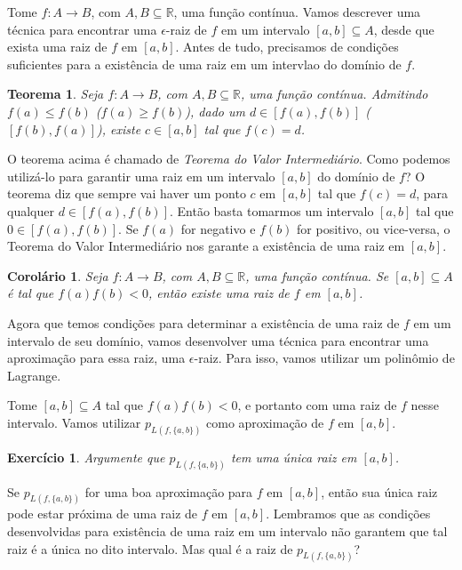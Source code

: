 \documentclass[]{article}
\newtheorem{teorema}{Teorema}
\newtheorem{corolario}{Corolário}
\newtheorem{exercicio}{Exercício}
\numberwithin{equation}{section}
\begin{document}
Tome $f : A \to B$, com $A, B \subseteq \mathbb{R}$, uma função
contínua. Vamos descrever uma técnica para encontrar uma
$\epsilon$-raiz de $f$ em um intervalo $[a, b] \subseteq A$, desde que
exista uma raiz de $f$ em $[a, b]$. Antes de tudo, precisamos de
condições suficientes para a existência de uma raiz em um intervlao do
domínio de $f$.

\begin{teorema}
  Seja $f : A \to B$, com $A, B \subseteq \mathbb{R}$, uma função
  contínua. Admitindo $f(a) \leq f(b)$ ($f(a) \geq f(b)$), dado um
  $d \in [f(a), f(b)]$ ($[f(b), f(a)]$), existe $c \in [a, b]$ tal que
  $f(c) = d$.
\end{teorema}

O teorema acima é chamado de \emph{Teorema do Valor
  Intermediário}. Como podemos utilizá-lo para garantir uma raiz em um
intervalo $[a, b]$ do domínio de $f$? O teorema diz que sempre vai
haver um ponto $c$ em $[a, b]$ tal que $f(c) = d$, para qualquer
$d \in [f(a), f(b)]$. Então basta tomarmos um intervalo $[a, b]$ tal
que $0 \in [f(a), f(b)]$. Se $f(a)$ for negativo e $f(b)$ for
positivo, ou vice-versa, o Teorema do Valor Intermediário nos garante
a existência de uma raiz em $[a, b]$.

\begin{corolario}
  Seja $f : A \to B$, com $A, B \subseteq \mathbb{R}$, uma função
  contínua. Se $[a, b] \subseteq A$ é tal que $f(a)f(b) < 0$, então
  existe uma raiz de $f$ em $[a, b]$.
\end{corolario}

Agora que temos condições para determinar a existência de uma raiz de
$f$ em um intervalo de seu domínio, vamos desenvolver uma técnica para
encontrar uma aproximação para essa raiz, uma $\epsilon$-raiz. Para
isso, vamos utilizar um polinômio de Lagrange.

Tome $[a, b] \subseteq A$ tal que $f(a)f(b) < 0$, e portanto com uma
raiz de $f$ nesse intervalo. Vamos utilizar $p_{L(f, \{a, b\})}$ como
aproximação de $f$ em $[a, b]$.

\begin{exercicio}
  Argumente que $p_{L(f, \{a, b\})}$ tem uma única raiz em $[a, b]$.
\end{exercicio}

Se $p_{L(f, \{a, b\})}$ for uma boa aproximação para $f$ em $[a, b]$,
então sua única raiz pode estar próxima de uma raiz de $f$ em
$[a, b]$. Lembramos que as condições desenvolvidas para existência de
uma raiz em um intervalo não garantem que tal raiz é a única no dito
intervalo. Mas qual é a raiz de $p_{L(f, \{a, b\})}$?
\end{document}
